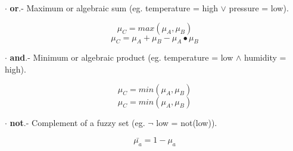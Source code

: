 $\cdot$ \textbf{or}.- Maximum or algebraic sum (eg. temperature = high $\vee$ pressure = low).
\begin{center}
\begin{equation}
\label{fuzzySet11}
	\mu_C = max(\mu_A,\mu_B) 
\end{equation}
\begin{equation}
\label{fuzzySet12}
	\mu_C = \mu_A + \mu_B - \mu_A\bullet\mu_B
\end{equation}
\end{center}


$\cdot$ \textbf{and}.- Minimum or algebraic product (eg. temperature = low $\wedge$ humidity = high).
\begin{center}
\begin{equation}
\label{fuzzySet21}
	\mu_C = min(\mu_A, \mu_B) 
\end{equation}
\begin{equation}
\label{fuzzySet22}
	\mu_C = min(\mu_A, \mu_B) 
\end{equation}
\end{center}

$\cdot$ \textbf{not}.- Complement of a fuzzy set (eg. $\neg$ low = not(low)).
\begin{center}
\begin{equation}
\label{fuzzySet3}
	\bar{\mu_a} = 1 - \mu_a
\end{equation}
\end{center}
%




